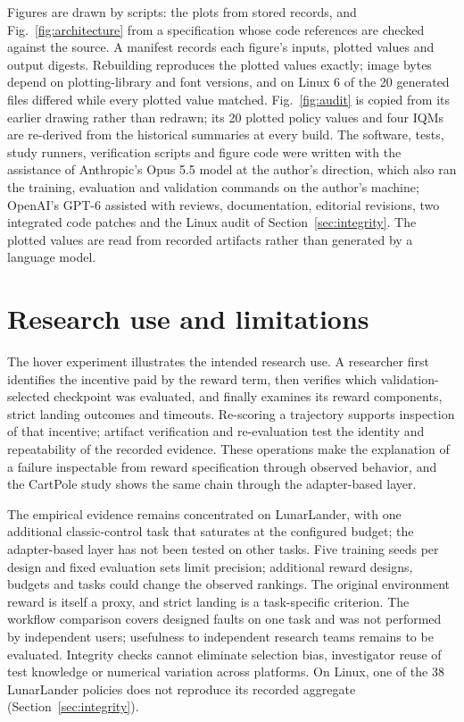 \documentclass[preprint,12pt]{elsarticle}
\begin{document}
Figures are drawn by scripts: the plots from stored records, and Fig.~\ref{fig:architecture} from a specification whose code references are checked against the source. A manifest records each figure's inputs, plotted values and output digests. Rebuilding reproduces the plotted values exactly; image bytes depend on plotting-library and font versions, and on Linux 6 of the 20 generated files differed while every plotted value matched. Fig.~\ref{fig:audit} is copied from its earlier drawing rather than redrawn; its 20 plotted policy values and four IQMs are re-derived from the historical summaries at every build. The software, tests, study runners, verification scripts and figure code were written with the assistance of Anthropic's Opus 5.5 model at the author's direction, which also ran the training, evaluation and validation commands on the author's machine; OpenAI's GPT-6 assisted with reviews, documentation, editorial revisions, two integrated code patches and the Linux audit of Section~\ref{sec:integrity}. The plotted values are read from recorded artifacts rather than generated by a language model.

\section{Research use and limitations}
The hover experiment illustrates the intended research use. A researcher first identifies the incentive paid by the reward term, then verifies which validation-selected checkpoint was evaluated, and finally examines its reward components, strict landing outcomes and timeouts. Re-scoring a trajectory supports inspection of that incentive; artifact verification and re-evaluation test the identity and repeatability of the recorded evidence. These operations make the explanation of a failure inspectable from reward specification through observed behavior, and the CartPole study shows the same chain through the adapter-based layer.

The empirical evidence remains concentrated on LunarLander, with one additional classic-control task that saturates at the configured budget; the adapter-based layer has not been tested on other tasks. Five training seeds per design and fixed evaluation sets limit precision; additional reward designs, budgets and tasks could change the observed rankings. The original environment reward is itself a proxy, and strict landing is a task-specific criterion. The workflow comparison covers designed faults on one task and was not performed by independent users; usefulness to independent research teams remains to be evaluated. Integrity checks cannot eliminate selection bias, investigator reuse of test knowledge or numerical variation across platforms. On Linux, one of the 38 LunarLander policies does not reproduce its recorded aggregate (Section~\ref{sec:integrity}).
\end{document}
